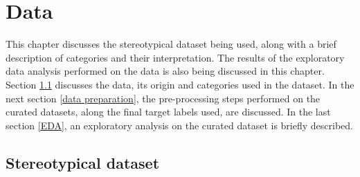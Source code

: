 \chapter{Data}

This chapter discusses the stereotypical dataset being used, along with a brief description of categories and their interpretation. The results of the exploratory data analysis performed on the data is also being discussed in this chapter. Section \ref{stereotypical dataset} discusses the data, its origin and categories used in the dataset. In the next section \ref{data preparation}, the pre-processing steps performed on the curated datasets, along the final target labels used, are discussed. In the last section \ref{EDA}, an exploratory analysis on the curated dataset is briefly described.

\section{Stereotypical dataset}\label{stereotypical dataset}
